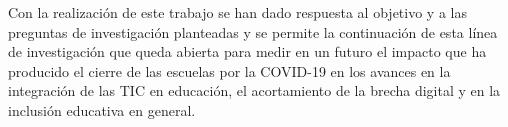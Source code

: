 \documentclass[spanish]{textolivre}
\begin{document}
Con la realización de este trabajo se han dado respuesta al objetivo y a las preguntas de investigación planteadas y se permite la continuación de esta línea de investigación que queda abierta para medir en un futuro el impacto que ha producido el cierre de las escuelas por la COVID-19 en los avances en la integración de las TIC en educación, el acortamiento de la brecha digital y en la inclusión educativa en general.


\printbibliography\label{sec-bib}
\end{document}
